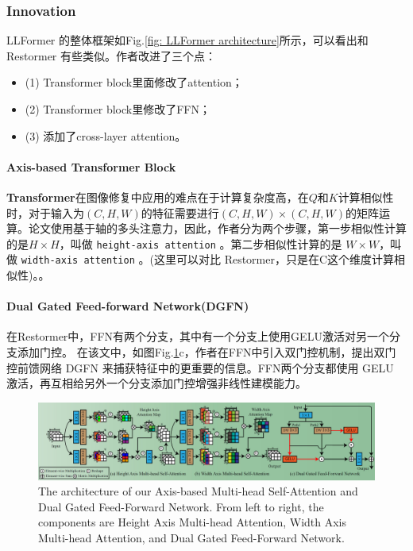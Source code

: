 \documentclass[letterpaper,10pt]{article}
\begin{document}
	\subsubsection{Innovation}
	
	LLFormer 的整体框架如Fig.\ref{fig: LLFormer architecture}所示，可以看出和 Restormer 有些类似。作者改进了三个点：
	\begin{itemize}
		\item {(1)} Transformer block里面修改了attention；
		\item {(2)} Transformer block里修改了FFN；
		\item {(3)} 添加了cross-layer attention。
	\end{itemize}
	
	\paragraph{Axis-based Transformer Block}
	
	\textbf{Transformer}在图像修复中应用的难点在于计算复杂度高，在$Q$和$K$计算相似性时，对于输入为$(C,H,W)$的特征需要进行$(C,H,W) \times (C,H,W)$的矩阵运算。论文使用基于轴的多头注意力，因此，作者分为两个步骤，第一步相似性计算的是$H \times H$，叫做 \texttt{height-axis attention} 。第二步相似性计算的是 $W \times W$，叫做 \texttt{width-axis attention} 。(这里可以对比 Restormer，只是在C这个维度计算相似性)。。
	
	\paragraph{Dual Gated Feed-forward Network(DGFN)}
	
	在Restormer中，FFN有两个分支，其中有一个分支上使用GELU激活对另一个分支添加门控。
	在该文中，如图Fig.\ref{fig: Axis-based Transformer Block & Dual Gated Feed-forward Network(GDFN)}c，作者在FFN中引入双门控机制，提出双门控前馈网络 DGFN 来捕获特征中的更重要的信息。FFN两个分支都使用 GELU 激活，再互相给另外一个分支添加门控增强非线性建模能力。
	
	\begin{figure}[htbp]
		\centering 
		\includegraphics[width=\columnwidth]{picture/Axis_based_Transformer_Block_&_Dual_Gated_Feed-forward_Network(GDFN)}
		\captionsetup{font=scriptsize}
		\caption{
			\label{fig: Axis-based Transformer Block & Dual Gated Feed-forward Network(GDFN)} %
			The architecture of our Axis-based Multi-head Self-Attention and Dual Gated Feed-Forward Network. From left to right, the components are Height Axis Multi-head Attention, Width Axis Multi-head Attention, and Dual Gated Feed-Forward Network.
		}
	\end{figure}
	
\end{document}
